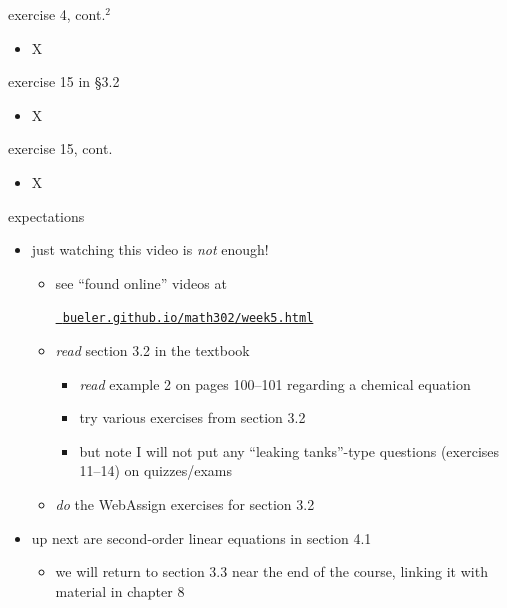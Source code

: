 \documentclass{beamer}
\begin{document}
\begin{frame}{exercise 4, cont.$^2$}

\begin{itemize}
\item X
\end{itemize}
\end{frame}


\begin{frame}{exercise 15 in \S3.2}

\begin{itemize}
\item X
\end{itemize}
\end{frame}


\begin{frame}{exercise 15, cont.}

\begin{itemize}
\item X
\end{itemize}
\end{frame}

\begin{frame}{expectations}

\begin{itemize}
\item just watching this video is \emph{not} enough!
     \begin{itemize}
     \item see ``found online'' videos at

     \centerline{\href{https://bueler.github.io/math302/week5.html}{\tt \color{cyan} bueler.github.io/math302/week5.html}}
     \item \emph{read} section 3.2 in the textbook
         \begin{itemize}
         \item \emph{read} example 2 on pages 100--101 regarding a chemical equation
         \item try various exercises from section 3.2
         \item but note I will not put any ``leaking tanks''-type questions (exercises 11--14) on quizzes/exams
         \end{itemize}
     \item \emph{do} the WebAssign exercises for section 3.2
     \end{itemize}

\bigskip
\item up next are second-order linear equations in section 4.1
    \begin{itemize}
    \item we will return to section 3.3 near the end of the course, linking it with material in chapter 8
    \end{itemize}
\end{itemize}
\end{frame}
\end{document}

